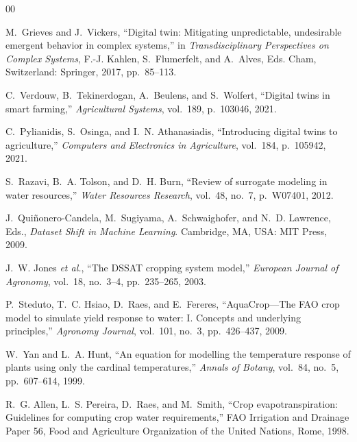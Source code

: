 \documentclass[conference]{IEEEtran}
\begin{document}
\begin{thebibliography}{00}

M.~Grieves and J.~Vickers, ``Digital twin: Mitigating unpredictable, undesirable emergent behavior
in complex systems,'' in \emph{Transdisciplinary Perspectives on Complex Systems}, F.-J. Kahlen,
S.~Flumerfelt, and A.~Alves, Eds. Cham, Switzerland: Springer, 2017, pp.~85--113.

C.~Verdouw, B.~Tekinerdogan, A.~Beulens, and S.~Wolfert, ``Digital twins in smart farming,''
\emph{Agricultural Systems}, vol.~189, p.~103046, 2021.

C.~Pylianidis, S.~Osinga, and I.~N. Athanasiadis, ``Introducing digital twins to agriculture,''
\emph{Computers and Electronics in Agriculture}, vol.~184, p.~105942, 2021.

S.~Razavi, B.~A. Tolson, and D.~H. Burn, ``Review of surrogate modeling in water resources,''
\emph{Water Resources Research}, vol.~48, no.~7, p.~W07401, 2012.

J.~Qui\~{n}onero-Candela, M.~Sugiyama, A.~Schwaighofer, and N.~D. Lawrence, Eds., \emph{Dataset
Shift in Machine Learning}. Cambridge, MA, USA: MIT Press, 2009.

J.~W. Jones \emph{et al.}, ``The DSSAT cropping system model,'' \emph{European Journal of
Agronomy}, vol.~18, no.~3--4, pp.~235--265, 2003.

P.~Steduto, T.~C. Hsiao, D.~Raes, and E.~Fereres, ``AquaCrop---The FAO crop model to simulate
yield response to water: I. Concepts and underlying principles,'' \emph{Agronomy Journal},
vol.~101, no.~3, pp.~426--437, 2009.

W.~Yan and L.~A. Hunt, ``An equation for modelling the temperature response of plants using only
the cardinal temperatures,'' \emph{Annals of Botany}, vol.~84, no.~5, pp.~607--614, 1999.

R.~G. Allen, L.~S. Pereira, D.~Raes, and M.~Smith, ``Crop evapotranspiration: Guidelines for
computing crop water requirements,'' FAO Irrigation and Drainage Paper 56, Food and Agriculture
Organization of the United Nations, Rome, 1998.


\end{thebibliography}
\end{document}
